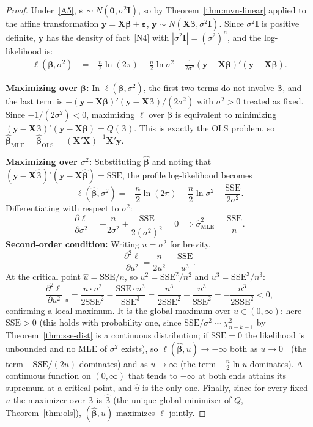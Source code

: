 \documentclass[14pt]{extarticle}
\theoremstyle{plain}
\theoremstyle{definition}
\theoremstyle{remark}
\newcommand{\SSE}{\mathrm{SSE}}
\newcommand{\bX}{\mathbf{X}}
\newcommand{\by}{\mathbf{y}}
\def\bb{\boldsymbol{\beta}}
\newcommand{\be}{\boldsymbol{\varepsilon}}
\newcommand{\bI}{\mathbf{I}}
\newcommand{\bzero}{\mathbf{0}}
\begin{document}
\begin{proof}
Under~\ref{A5}, $\be \sim N(\bzero, \sigma^2\bI)$, so by Theorem~\ref{thm:mvn-linear} applied to the affine transformation $\by = \bX\bb + \be$, $\by \sim N(\bX\bb, \sigma^2\bI)$. Since $\sigma^2\bI$ is positive definite, $\by$ has the density of fact~\ref{N4} with $|\sigma^2\bI| = (\sigma^2)^n$, and the log-likelihood is:
\begin{align*}
\ell(\bb, \sigma^2) &= -\frac{n}{2}\ln(2\pi) - \frac{n}{2}\ln\sigma^2 - \frac{1}{2\sigma^2}(\by - \bX\bb)'(\by - \bX\bb).
\end{align*}

\textbf{Maximizing over $\bb$:} In $\ell(\bb, \sigma^2)$, the first two terms do not involve $\bb$, and the last term is $-(\by - \bX\bb)'(\by - \bX\bb)/(2\sigma^2)$ with $\sigma^2 > 0$ treated as fixed. Since $-1/(2\sigma^2) < 0$, maximizing $\ell$ over $\bb$ is equivalent to minimizing $(\by - \bX\bb)'(\by - \bX\bb) = Q(\bb)$. This is exactly the OLS problem, so $\hat{\bb}_{\mathrm{MLE}} = \hat{\bb}_{\mathrm{OLS}} = (\bX'\bX)^{-1}\bX'\by$.

\textbf{Maximizing over $\sigma^2$:} Substituting $\hat{\bb}$ and noting that $(\by - \bX\hat{\bb})'(\by - \bX\hat{\bb}) = \SSE$, the profile log-likelihood becomes
\[
\ell(\hat{\bb}, \sigma^2) = -\frac{n}{2}\ln(2\pi) - \frac{n}{2}\ln\sigma^2 - \frac{\SSE}{2\sigma^2}.
\]
Differentiating with respect to $\sigma^2$:
\[
\frac{\partial \ell}{\partial \sigma^2} = -\frac{n}{2\sigma^2} + \frac{\SSE}{2(\sigma^2)^2} = 0 \implies \hat{\sigma}^2_{\mathrm{MLE}} = \frac{\SSE}{n}.
\]
\textbf{Second-order condition:} Writing $u = \sigma^2$ for brevity,
\[
\frac{\partial^2 \ell}{\partial u^2} = \frac{n}{2u^2} - \frac{\SSE}{u^3}.
\]
At the critical point $\hat{u} = \SSE/n$, so $u^2 = \SSE^2/n^2$ and $u^3 = \SSE^3/n^3$:
\[
\frac{\partial^2 \ell}{\partial u^2}\bigg|_{\hat{u}} = \frac{n \cdot n^2}{2\SSE^2} - \frac{\SSE \cdot n^3}{\SSE^3} = \frac{n^3}{2\SSE^2} - \frac{n^3}{\SSE^2} = -\frac{n^3}{2\SSE^2} < 0,
\]
confirming a local maximum. It is the global maximum over $u \in (0, \infty)$: here $\SSE > 0$ (this holds with probability one, since $\SSE/\sigma^2 \sim \chi^2_{n-k-1}$ by Theorem~\ref{thm:sse-dist} is a continuous distribution; if $\SSE = 0$ the likelihood is unbounded and no MLE of $\sigma^2$ exists), so $\ell(\hat{\bb}, u) \to -\infty$ both as $u \to 0^+$ (the term $-\SSE/(2u)$ dominates) and as $u \to \infty$ (the term $-\tfrac{n}{2}\ln u$ dominates). A continuous function on $(0,\infty)$ that tends to $-\infty$ at both ends attains its supremum at a critical point, and $\hat{u}$ is the only one. Finally, since for every fixed $u$ the maximizer over $\bb$ is $\hat{\bb}$ (the unique global minimizer of $Q$, Theorem~\ref{thm:ols}), $(\hat{\bb}, \hat{u})$ maximizes $\ell$ jointly.


\end{proof}
\end{document}
